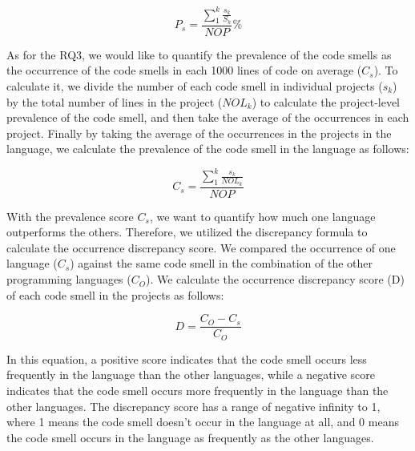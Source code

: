 \vspace{-1em}

\begin{equation}
    P_{s} = \frac{\sum_{1}^{k}\frac{{s_{k}}}{S_{k}}}{NOP}\%
\end{equation}

As for the RQ3, we would like to quantify the prevalence of the code smells as
the occurrence of the code smells in each 1000 lines of code on average
($C_{s}$). To calculate it, we divide the number of each code smell in
individual projects ($s_{k}$) by the total number of lines in the project
($NOL_{k}$) to calculate the project-level prevalence of the code smell, and
then take the average of the occurrences in each project. Finally by taking the
average of the occurrences in the projects in the language, we calculate the
prevalence of the code smell in the language as follows:

\vspace{-1.0em}

\begin{equation}
    C_{s} = \frac{\sum_{1}^{k}{\frac{s_{k}}{NOL_{k}}}}{NOP}
\end{equation}

With the prevalence score $C_{s}$, we want to quantify how much one language
outperforms the others. Therefore, we utilized the discrepancy formula to
calculate the occurrence discrepancy score. We compared the occurrence of one
language ($C_{s}$) against the same code smell in the combination of the other
programming languages ($C_{O}$). We calculate the occurrence discrepancy score
(D) of each code smell in the projects as follows:

\vspace{-1.0em}

\begin{equation}
    D = \frac{C_{O} - C_{s}}{C_{O}}
\end{equation}

In this equation, a positive score indicates that the code smell occurs less
frequently in the language than the other languages, while a negative score
indicates that the code smell occurs more frequently in the language than the
other languages. The discrepancy score has a range of negative infinity to 1,
where 1 means the code smell doesn't occur in the language at all, and 0 means
the code smell occurs in the language as frequently as the other languages.




